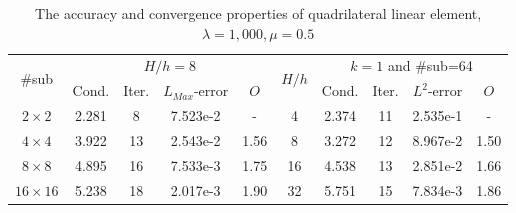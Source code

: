 										\begin{table}[ht]
											\small
											\vspace{-10pt}
											\setlength{\tabcolsep}{1pt} {
												\vspace{-5pt}
												\begin{center}
													\begin{tabular}{c|cccc|c|cccc}
														\hline
														\multirow{2}{*}{\#sub} &\multicolumn{4}{c|}{ $H/h=8$} &\multirow{2}{*}{$H/h$} &\multicolumn{4}{c}{$k=1$ and \#sub=64}\\ 
														& Cond.   & Iter. &$L_{Max}$-error & $O$& & Cond.   & Iter. &$L^2$-error & $O$ \\
														
														\hline
														$2\times 2$     & 2.281 & 8   & 7.523e-2 & - & 4   & 2.374 &11 & 2.535e-1 &- \\
														$4\times 4$     &3.922 &13 &2.543e-2 & 1.56 & 8   & 3.272 &12 & 8.967e-2 & 1.50  \\
														$8\times 8$  & 4.895 &16 & 7.533e-3 & 1.75 & 16   & 4.538 &13 & 2.851e-2 & 1.66 \\
														$16\times 16$ &5.238&18 & 2.017e-3 & 1.90 & 32   & 5.751 &15 & 7.834e-3 & 1.86 \\
														\hline	
													\end{tabular}
												\end{center} }
												\caption{The accuracy and convergence properties of quadrilateral linear element, $ \lambda = 1,000, \mu = 0.5 $}
												\label{Tab:lockfree2}
											\end{table}
											
